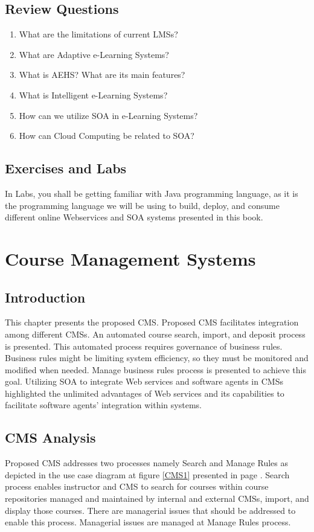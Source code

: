 \documentclass[12pt,a4paper,final,twoside,onecolumn,titlepage]{book}
\begin{document}
\section{Review Questions}
\begin{enumerate}
\item What are the limitations of current \gls{LMS}s?
\item What are Adaptive e-Learning Systems?
\item What is \gls{AEHS}? What are its main features?
\item What is Intelligent e-Learning Systems?
\item How can we utilize \gls{SOA} in e-Learning Systems?
\item How can Cloud Computing be related to \gls{SOA}?
\end{enumerate}

\section{Exercises and Labs}
In Labs, you shall be getting familiar with Java programming language, as it is the programming language we will be using to build, deploy, and consume different online Webservices and \gls{SOA} systems presented in this book.


\chapter{Course Management Systems}
\label{CMS}
\section{Introduction}
This chapter presents the proposed \gls{CMS}. Proposed \gls{CMS} facilitates integration among different \gls{CMS}s. An automated course search, import, and deposit process is presented. This automated process requires governance of business rules. Business rules might be limiting system efficiency, so they must be monitored and modified when needed. Manage business rules process is presented to achieve this goal. Utilizing \gls{SOA} to integrate Web services and software agents in \gls{CMS}s highlighted the unlimited advantages of Web services and its capabilities to facilitate software agents’ integration within systems.
\section{CMS Analysis}
Proposed \gls{CMS} addresses two processes namely Search and Manage Rules as depicted in the use case diagram at figure \ref{CMS1} presented in page \pageref{CMS1}. Search process enables instructor and \gls{CMS} to search for courses within course repositories managed and maintained by internal and external \gls{CMS}s, import, and display those courses. There are managerial issues that should be addressed to enable this process. Managerial issues are managed at Manage Rules process.
\end{document}
